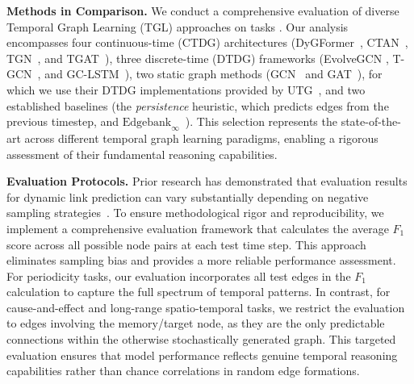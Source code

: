 
 \textbf{Methods in Comparison.} We conduct a comprehensive evaluation of diverse Temporal Graph Learning (TGL) approaches on \benchmarkname tasks 
. Our analysis encompasses four continuous-time (CTDG) architectures (DyGFormer~\cite{dygformer}, CTAN~\cite{ctan}, TGN~\cite{tgn}, and TGAT~\cite{tgat}), three discrete-time (DTDG) frameworks (EvolveGCN \cite{evolvegcn}, T-GCN~\cite{tgcn}, and GC-LSTM~\cite{gclstm}), two static graph methods (GCN~\citep{gcn} and GAT~\citep{gat}), for which we use their DTDG implementations provided by UTG~\citep{huangutg}, and two established baselines (the \textit{persistence} heuristic, which predicts edges from the previous timestep, and $\text{Edgebank}_{\infty}$~\citep{poursafaei2022betterevaluationdynamiclink}). This selection represents the state-of-the-art across different temporal graph learning paradigms, enabling a rigorous assessment of their fundamental reasoning capabilities. 




\textbf{Evaluation Protocols.}
Prior research has demonstrated that evaluation results for dynamic link prediction can vary substantially depending on negative sampling strategies~\cite{poursafaei2022betterevaluationdynamiclink}. To ensure methodological rigor and reproducibility, we implement a comprehensive evaluation framework that calculates the average $F_1$ score across all possible node pairs at each test time step. This approach eliminates sampling bias and provides a more reliable performance assessment. For periodicity tasks, our evaluation incorporates all test edges in the $F_1$ calculation to capture the full spectrum of temporal patterns. In contrast, for cause-and-effect and long-range spatio-temporal tasks, we restrict the evaluation to edges involving the memory/target node, as they are the only predictable connections within the otherwise stochastically generated graph. This targeted evaluation ensures that model performance reflects genuine temporal reasoning capabilities rather than chance correlations in random edge formations.


